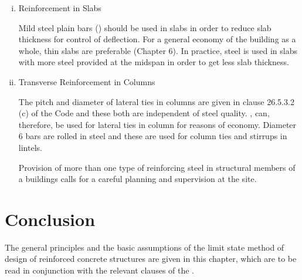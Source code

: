 \begin{enumerate}[(i)]
\item Reinforcement in Slabs

Mild steel plain bars () should be used in slabs in order to reduce
slab thickness for control of deflection. For a general economy of the
building as a whole, thin slabs are preferable (Chapter 6). In practice,
{\fefouronefive} steel is used in slabs with more steel provided at the midspan
in order to get less slab thickness.

\item Transverse Reinforcement in Columns

The pitch and diameter of lateral ties in columns are given in clause
26.5.3.2 (c) of the Code and these both are independent of steel quality.
{\fetwofivezero}, {\fetwofivezero} can, therefore, be used for lateral
ties in column for reasons of economy. Diameter 6 \mm bars are rolled in
{\fetwofivezero} steel and these are used for column ties and stirrups in lintels.

Provision of more than one type of reinforcing steel in structural
members of a buildings calls for a careful planning and supervision at
the site.
\end{enumerate}

\section{Conclusion}
The general principles and the basic assumptions of the limit state
method of design of reinforced concrete structures are given in this
chapter, which are to be read in conjunction with the relevant clauses
of the .
